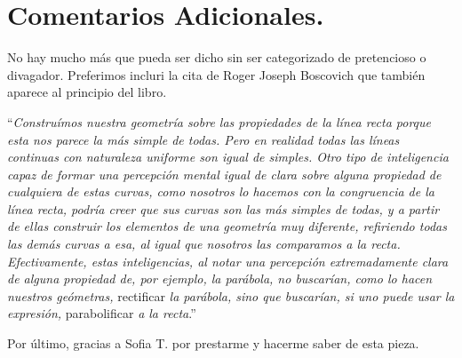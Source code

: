 \section{Comentarios Adicionales.}

No hay mucho más que pueda ser dicho sin ser categorizado de pretencioso o divagador. Preferimos incluri la cita de Roger Joseph Boscovich que también aparece al principio del libro.

\enquote{\textit{Construímos nuestra geometría sobre las propiedades de la línea recta porque esta nos parece la más simple de todas. Pero en realidad todas las líneas continuas con naturaleza uniforme son igual de simples. Otro tipo de inteligencia capaz de formar una percepción mental igual de clara sobre alguna propiedad de cualquiera de estas curvas, como nosotros lo hacemos con la congruencia de la línea recta, podría creer que sus curvas son las más simples de todas, y a partir de ellas construir los elementos de una geometría muy diferente, refiriendo todas las demás curvas a esa, al igual que nosotros las comparamos a la recta. Efectivamente, estas inteligencias, al notar una percepción extremadamente clara de alguna propiedad de, por ejemplo, la parábola, no buscarían, como lo hacen nuestros geómetras,} rectificar \textit{la parábola, sino que buscarían, si uno puede usar la expresión,} parabolificar \textit{a la recta}.}

Por último, gracias a Sofia T. por prestarme y hacerme saber de esta pieza.
